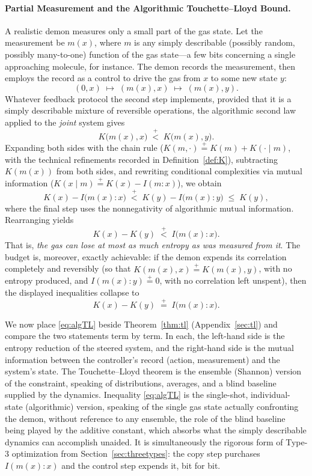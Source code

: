 \documentclass[11pt]{article}
\newcommand{\plt}{\mathrel{\stackrel{+}{<}}}
\newcommand{\peq}{\mathrel{\stackrel{+}{=}}}
\begin{document}
\paragraph{Partial Measurement and the Algorithmic Touchette--Lloyd Bound.} A realistic demon measures only a small part of the gas state. Let the measurement be $m(x)$, where $m$ is any simply describable (possibly random, possibly many-to-one) function of the gas state---a few bits concerning a single approaching molecule, for instance. The demon records the measurement, then employs the record as a control to drive the gas from $x$ to some new state $y$:
\[
(0, x) \;\mapsto\; (m(x), x) \;\mapsto\; (m(x), y).
\]
Whatever feedback protocol the second step implements, provided that it is a simply describable mixture of reversible operations, the algorithmic second law applied to the \emph{joint} system gives
\[
K\big(m(x), x\big) \;\plt\; K\big(m(x), y\big).
\]
Expanding both sides with the chain rule ($K(m,\cdot) \peq K(m) + K(\cdot \mid m)$, with the technical refinements recorded in Definition~\ref{def:K}), subtracting $K(m(x))$ from both sides, and rewriting conditional complexities via mutual information ($K(x \mid m) \peq K(x) - I(m : x)$), we obtain
\[
K(x) - I\big(m(x) : x\big) \;\plt\; K(y) - I\big(m(x) : y\big) \;\le\; K(y),
\]
where the final step uses the nonnegativity of algorithmic mutual information. Rearranging yields
\begin{equation}
\label{eq:algTL}
\boxed{\;K(x) - K(y) \;\plt\; I\big(m(x) : x\big).\;}
\end{equation}
That is, \emph{the gas can lose at most as much entropy as was measured from it}. The budget is, moreover, exactly achievable: if the demon expends its correlation completely and reversibly (so that $K(m(x), x) \peq K(m(x), y)$, with no entropy produced, and $I(m(x) : y) \peq 0$, with no correlation left unspent), then the displayed inequalities collapse to
\[
K(x) - K(y) \;\peq\; I\big(m(x) : x\big).
\]

We now place \eqref{eq:algTL} beside Theorem~\ref{thm:tl} (Appendix~\ref{sec:tl}) and compare the two statements term by term. In each, the left-hand side is the entropy reduction of the steered system, and the right-hand side is the mutual information between the controller's record (action, measurement) and the system's state. The Touchette--Lloyd theorem is the ensemble (Shannon) version of the constraint, speaking of distributions, averages, and a blind baseline supplied by the dynamics. Inequality \eqref{eq:algTL} is the single-shot, individual-state (algorithmic) version, speaking of the single gas state actually confronting the demon, without reference to any ensemble, the role of the blind baseline being played by the additive constant, which absorbs what the simply describable dynamics can accomplish unaided. It is simultaneously the rigorous form of Type-3 optimization from Section~\ref{sec:threetypes}: the copy step purchases $I(m(x):x)$ and the control step expends it, bit for bit.
\end{document}
